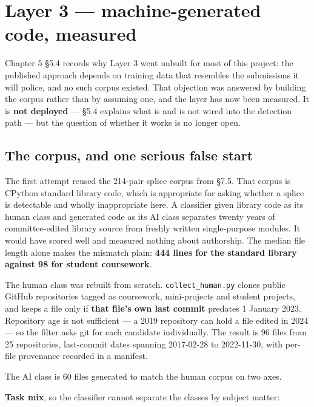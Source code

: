 \hypertarget{layer-3-machine-generated-code-measured}{%
\section{Layer 3 --- machine-generated code,
measured}\label{layer-3-machine-generated-code-measured}}

Chapter 5 \S{}5.4 records why Layer 3 went unbuilt for most of this
project: the published approach depends on training data that resembles
the submissions it will police, and no such corpus existed. That
objection was answered by building the corpus rather than by assuming
one, and the layer has now been measured. It is \textbf{not deployed}
--- \S{}5.4 explains what is and is not wired into the detection path ---
but the question of whether it works is no longer open.

\hypertarget{the-corpus-and-one-serious-false-start}{%
\subsection{The corpus, and one serious false
start}\label{the-corpus-and-one-serious-false-start}}

The first attempt reused the 214-pair splice corpus from \S{}7.5. That
corpus is CPython standard library code, which is appropriate for asking
whether a splice is detectable and wholly inappropriate here. A
classifier given library code as its human class and generated code as
its AI class separates twenty years of committee-edited library source
from freshly written single-purpose modules. It would have scored well
and measured nothing about authorship. The median file length alone
makes the mismatch plain: \textbf{444 lines for the standard library
against 98 for student coursework}.

The human class was rebuilt from scratch. \texttt{collect\_human.py}
clones public GitHub repositories tagged as coursework, mini-projects
and student projects, and keeps a file only if \textbf{that file's own
last commit} predates 1 January 2023. Repository age is not sufficient
--- a 2019 repository can hold a file edited in 2024 --- so the filter
asks git for each candidate individually. The result is 96 files from 25
repositories, last-commit dates spanning 2017-02-28 to 2022-11-30, with
per-file provenance recorded in a manifest.

The AI class is 60 files generated to match the human corpus on two
axes.

\textbf{Task mix}, so the classifier cannot separate the classes by
subject matter:

